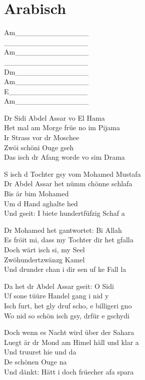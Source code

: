 \documentclass[
  letterpaper,
]{scrbook}
\begin{document}
\hypertarget{arabisch}{%
\chapter{Arabisch}\label{arabisch}}

\textbar Am\_\_\_\_\_\_\textbar\_\_\_\_\_\_\_\_\textbar{}\\
\textbar\_\_\_\_\_\_\_\_\textbar\_\_\_\_\_\_\_\_\textbar{}\\
\textbar Am\_\_\_\_\_\_\textbar\_\_\_\_\_\_\_\_\textbar{}\\
\textbar\_\_\_\_\_\_\_\_\textbar\_\_\_\_\_\_\_\_\textbar{}\\
\textbar Dm\_\_\_\_\_\_\textbar\_\_\_\_\_\_\_\_\textbar{}\\
\textbar Am\_\_\_\_\_\_\textbar\_\_\_\_\_\_\_\_\textbar{}\\
\textbar E\_\_\_\_\_\_\_\textbar\_\_\_\_\_\_\_\_\textbar{}\\
\textbar Am\_\_\_\_\_\_\textbar\_\_\_\_\_\_\_\_\textbar{}

Dr Sidi Abdel Assar vo El Hama\\
Het mal am Morge früe no im Pijama\\
Ir Strass vor dr Moschee\\
Zwöi schöni Ouge gseh\\
Das isch dr Afang worde vo sim Drama

S isch d Tochter gsy vom Mohamed Mustafa\\
Dr Abdel Assar het nümm chönne schlafa\\
Bis är bim Mohamed\\
Um d Hand aghalte hed\\
Und gseit: I biete hundertfüfzig Schaf a

Dr Mohamed het gantwortet: Bi Allah\\
Es fröit mi, dass my Tochter dir het gfalla\\
Doch wärt isch si, my Seel\\
Zwöhundertzwänzg Kamel\\
Und drunder chan i dir sen uf ke Fall la

Da het dr Abdel Assar gseit: O Sidi\\
Uf sone tüüre Handel gang i nid y\\
Isch furt, het gly druf scho, e billigeri gno\\
Wo nid so schön isch gsy, drfür e gschydi

Doch wenn es Nacht wird über der Sahara\\
Luegt är dr Mond am Himel häll und klar a\\
Und truuret hie und da\\
De schönen Ouge na\\
Und dänkt: Hätt i doch früecher afa spara
\end{document}
